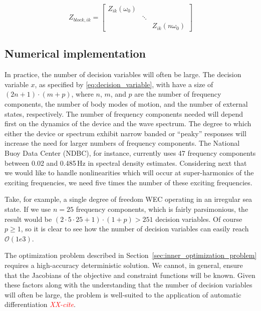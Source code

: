 \documentclass[]{article}
\newcommand{\todo}[1]{\textcolor{red}{\emph{#1}}}
\begin{document}
\begin{equation}
	Z_{block,ik} = 
	\begin{bmatrix}
		Z_{ik}(\omega_0) & & \\
		& \ddots & \\
		& &  Z_{ik}(n \omega_0)
	\end{bmatrix}
\end{equation}	

\subsection{Numerical implementation}\label{sec:numericalImplementation}
In practice, the number of decision variables will often be large.
The decision variable $x$, as specified by \eqref{eq:decision_variable}, with have a size of $(2n + 1) \cdot (m + p)$, where $n$, $m$, and $p$ are the number of frequency components, the number of body modes of motion, and the number of external states, respectively.
The number of frequency components needed will depend first on the dynamics of the device and the wave spectrum.
The degree to which either the device or spectrum exhibit narrow banded or ``peaky'' responses will increase the need for larger numbers of frequency components.
The National Buoy Data Center (NDBC), for instance, currently uses 47 frequency components between 0.02 and 0.485\,Hz in spectral density estimates.
Considering next that we would like to handle nonlinearities which will occur at super-harmonics of the exciting frequencies, we need five times the number of these exciting frequencies.

Take, for example, a single degree of freedom WEC operating in an irregular sea state.
If we use $n=25$ frequency components, which is fairly parsimonious, the result would be $(2\cdot 5 \cdot 25 + 1) \cdot (1 + p) > 251$ decision variables.
Of course $p \geq 1$, so it is clear to see how the number of decision variables can easily reach $\mathcal{O}(1e3)$.

The optimization problem described in Section~\ref{sec:inner_optimization_problem} requires a high-accuracy deterministic solution.
We cannot, in general, ensure that the Jacobians of the objective and constraint functions will be known.
Given these factors along with the understanding that the number of decision variables will often be large, the problem is well-suited to the application of automatic differentiation \todo{XX-cite}.
\end{document}
